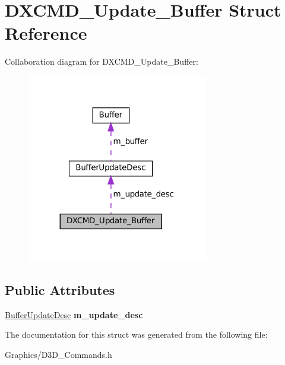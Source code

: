 \hypertarget{structDXCMD__Update__Buffer}{}\section{D\+X\+C\+M\+D\+\_\+\+Update\+\_\+\+Buffer Struct Reference}
\label{structDXCMD__Update__Buffer}


Collaboration diagram for D\+X\+C\+M\+D\+\_\+\+Update\+\_\+\+Buffer\+:
\nopagebreak
\begin{figure}[H]
\begin{center}
\leavevmode
\includegraphics[width=224pt]{structDXCMD__Update__Buffer__coll__graph}
\end{center}
\end{figure}
\subsection*{Public Attributes}
\begin{DoxyCompactItemize}
\item 
\mbox{\label{structDXCMD__Update__Buffer_a9ba3a77094da62ec742309d5588caaaf}} 
\hyperlink{structBufferUpdateDesc}{Buffer\+Update\+Desc} {\bfseries m\+\_\+update\+\_\+desc}
\end{DoxyCompactItemize}


The documentation for this struct was generated from the following file\+:\begin{DoxyCompactItemize}
\item 
Graphics/D3\+D\+\_\+\+Commands.\+h\end{DoxyCompactItemize}
